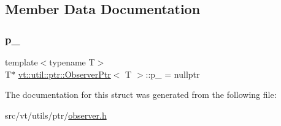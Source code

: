 \subsection{Member Data Documentation}
\mbox{\label{structvt_1_1util_1_1ptr_1_1_observer_ptr_afa7f8e2e3bca0e7ec27d61e10443b463}} 
\subsubsection{\texorpdfstring{p\+\_\+}{p\_}}
{\footnotesize\ttfamily template$<$typename T$>$ \\
T$\ast$ \hyperlink{structvt_1_1util_1_1ptr_1_1_observer_ptr}{vt\+::util\+::ptr\+::\+Observer\+Ptr}$<$ T $>$\+::p\+\_\+ = nullptr\hspace{0.3cm}{\ttfamily [private]}}



The documentation for this struct was generated from the following file\+:\begin{DoxyCompactItemize}
\item 
src/vt/utils/ptr/\hyperlink{observer_8h}{observer.\+h}\end{DoxyCompactItemize}
